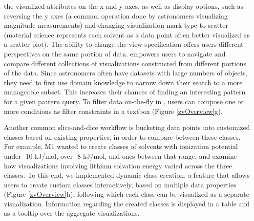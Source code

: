 the visualized attributes on the x and y axes, as well as display options, 
such as reversing the y axes (a common operation done by astronomers visualizing magnitude measurements) and changing visualization mark type to scatter (material science represents each solvent as a data point often better visualized as a scatter plot). The ability to change the view specification 
offers users different perspectives on the same portion of data.
 empowers users to 
navigate and compare different collections 
of visualizations constructed 
from  different portions of the data. 
Since astronomers often have datasets 
with large numbers of objects, 
they need to first use domain knowledge 
to narrow down their search to a more manageable subset.
This increases their chances of finding an 
interesting pattern for a given pattern query. 
To filter data on-the-fly in \zvpp, 
users can compose one or more conditions 
as filter constraints in a textbox (Figure \ref{zvOverview}g). 
\par Another common slice-and-dice workflow is 
bucketing data points into customized classes 
based on existing properties, in order to compare between these classes. 
For example, M1 wanted to create classes of solvents with ionization potential under -10 kJ/mol, over -8 kJ/mol, and ones between that range, and 
examine how visualizations involving lithium solvation energy 
varied across the three classes. 
To this end, we implemented dynamic class creation, 
a feature that allows users to create custom classes interactively, 
based on multiple data properties (Figure \ref{zvOverview}h),
following which each class can be visualized as a separate visualization. 
Information regarding the created classes is displayed in a table and as a tooltip over the aggregate visualizations.
%
